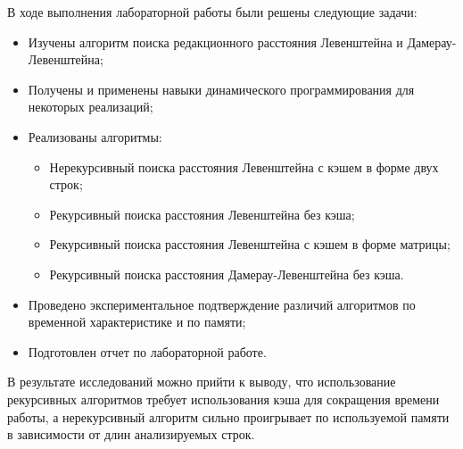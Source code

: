 
В ходе выполнения лабораторной работы были решены следующие задачи:

\begin{itemize}
	\item Изучены алгоритм поиска редакционного расстояния Левенштейна и Дамерау-Левенштейна;
	\item Получены и применены навыки динамического программирования для некоторых реализаций;
	\item Реализованы алгоритмы:
	\begin{itemize}
		\item Нерекурсивный поиска расстояния Левенштейна с кэшем в форме двух строк;
		\item Рекурсивный поиска расстояния Левенштейна без кэша;
		\item Рекурсивный поиска расстояния Левенштейна с кэшем в форме матрицы;
		\item Рекурсивный поиска расстояния Дамерау-Левенштейна без кэша.
	\end{itemize}
	\item Проведено экспериментальное подтверждение различий алгоритмов по временной характеристике и по памяти;
	\item Подготовлен отчет по лабораторной работе.
\end{itemize}

В результате исследований можно прийти к выводу, что использование рекурсивных алгоритмов требует использования кэша для сокращения времени работы, а нерекурсивный алгоритм сильно проигрывает по используемой памяти в зависимости от длин анализируемых строк.